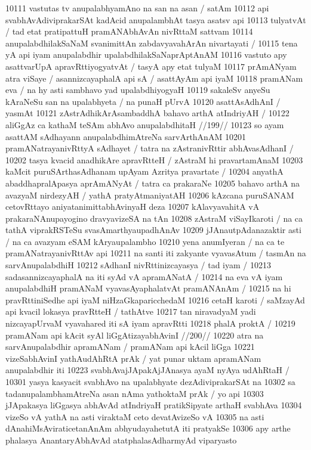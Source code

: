 10111 vastutas tv anupalabhyamAno na san na asan / satAm 
10112 api svabhAvAdiviprakarSAt kadAcid anupalambhAt tasya asatsv api
10113 tulyatvAt / tad etat pratipattuH pramANAbhAvAn nivRttaM sattvam  
10114 anupalabdhilakSaNaM svanimittAn zabdavyavahArAn nivartayati / 
10115 tena yA api iyam anupalabdhir upalabdhilakSaNaprAptAnAM 
10116 vastuto apy asattvarUpA apravRttiyogyatvAt / tasyA apy etat tulyaM  
10117 prAmANyam atra viSaye / asannizcayaphalA api sA / asattAyAm api iyaM
10118 pramANam eva / na hy asti sambhavo yad upalabdhiyogyaH
10119 sakaleSv anyeSu kAraNeSu san na upalabhyeta / na punaH pUrvA  
10120 asattAsAdhAnI / yasmAt 
10121 	zAstrAdhikArAsambaddhA bahavo arthA atIndriyAH /  
10122 	aliGgAz ca kathaM teSAm abhAvo anupalabdhitaH //199// 
10123 so ayam asattAM sAdhayann anupalabdhimAtreNa sarvArthAnAM
10201 pramANatrayanivRttyA sAdhayet / tatra na zAstranivRttir abhAvasAdhanI /
10202 tasya kvacid anadhikAre apravRtteH / zAstraM hi pravartamAnaM 
10203 kaMcit puruSArthasAdhanam upAyam Azritya pravartate /
10204 anyathA abaddhapralApasya aprAmANyAt / tatra ca prakaraNe  
10205 bahavo arthA na avazyaM nirdezyAH / yathA pratyAtmaniyatAH 
10206 kAzcana puruSANAM cetovRttayo aniyatanimittabhAvinyaH deza  
10207 kAlavyavahitA vA prakaraNAnupayogino dravyavizeSA na tAn
10208 zAstraM viSayIkaroti / na ca tathA viprakRSTeSu  svasAmarthyaupadhAnAv
10209 jJAnautpAdanazaktir asti / na ca avazyam eSAM kAryaupalambho 
10210 yena anumIyeran / na ca te pramANatrayanivRttAv api
10211 na santi iti zakyante vyavasAtum / tasmAn na sarvAnupalabdhiH
10212 sAdhanI nivRttinizcayasya / tad iyam /
10213 	sadasannizcayaphalA na iti syAd vA apramANatA /  
10214 na eva vA iyam anupalabdhiH pramANaM vyavasAyaphalatvAt pramANAnAm /
10215 na hi pravRttiniSedhe api iyaM niHzaGkaparicchedaM 
10216 cetaH karoti / saMzayAd api kvacil lokasya pravRtteH / tathAtve
10217 tan niravadyaM yadi nizcayapUrvaM vyavahared iti sA iyam apravRtti 
10218 phalA proktA / 
10219 	pramANam api kAcit syAl liGgAtizayabhAvinI //200//  
10220 atra na sarvAnupalabdhir apramANam / pramANam api kAcil liGga 
10221 vizeSabhAvinI yathAudAhRtA prAk / yat punar uktam apramANam anupalabdhir iti
10223 	svabhAvajJApakAjJAnasya ayaM nyAya udAhRtaH / 
10301 yasya kasyacit svabhAvo na upalabhyate dezAdiviprakarSAt na
10302 sa tadanupalambhamAtreNa asan nAma yathoktaM prAk / yo api  
10303 jJApakasya liGgasya abhAvAd atIndriyaH pratikSipyate arthaH svabhAva
10304 vizeSo vA yathA na asti viraktaM ceto devatAvizeSo vA 
10305 na asti dAnahiMsAviraticetanAnAm abhyudayahetutA iti pratyakSe
10306 apy arthe phalasya AnantaryAbhAvAd atatphalasAdharmyAd viparyasto  
